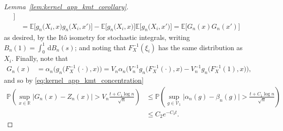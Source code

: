 \documentclass[11pt,lof]{puthesis}
\renewcommand{\P}{\ensuremath{\mathbb{P}}}
\newcommand{\R}{\ensuremath{\mathbb{R}}}
\newcommand{\E}{\ensuremath{\mathbb{E}}}
\newcommand{\cV}{\ensuremath{\mathcal{V}}}
\newcommand{\diff}[1]{\,\mathrm{d}#1}
\theoremstyle{break}
\theoremstyle{proof}
\newtheorem{proof}{Proof}
\begin{document}
\begin{proof}[Lemma~\ref{lem:kernel_app_kmt_corollary}]
\begin{align*}
    \Big] \\
    &=
    \E\Big[
      g_n\big(X_i, x\big)
      g_n\big(X_i, x'\big)
    \Big]
    - \E\Big[
      g_n\big(X_i, x\big)
    \Big]
    \E\Big[
      g_n\big(X_i, x'\big)
    \Big]
    =
    \E\big[
      G_n(x)
      G_n(x')
    \big]
  \end{align*}
  as desired, by the It\^o isometry for stochastic integrals,
  writing $B_n(1) = \int_0^1 \diff{B_n(s)}$;
  and noting that $F_X^{-1}(\xi_i)$
  has the same distribution as $X_i$.
  Finally, note that
  \begin{align*}
    G_n(x)
    &=
    \alpha_n \Big(g_n\big(F_X^{-1}(\cdot), x\big)\Big)
    = V_n \alpha_n \Big(
      V_n^{-1} g_n\big(F_X^{-1}(\cdot), x\big)
      - V_n^{-1} g_n\big(F_X^{-1}(1), x\big)
    \Big),
  \end{align*}
  and so by \eqref{eq:kernel_app_kmt_concentration}
  \begin{align*}
    \P\left(
      \sup_{x \in \R}
      \Big|G_n(x) - Z_n(x)\Big|
      > V_n \frac{t + C_1 \log n}{\sqrt n}
    \right)
    &\leq
    \P\left(
      \sup_{g \in \cV_1}
      \big|\alpha_n(g) - \beta_n(g)\big|
      > \frac{t + C_1\log n}{\sqrt{n}}
    \right) \\
    &\leq C_2 e^{-C_3 t}.
  \end{align*}
\end{proof}
\end{document}
